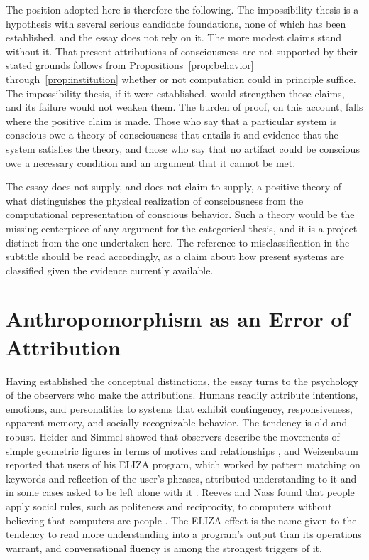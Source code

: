 \documentclass[12pt]{article}
\theoremstyle{definition}
\begin{document}
The position adopted here is therefore the following. The impossibility thesis is a hypothesis with several serious candidate foundations, none of which has been established, and the essay does not rely on it. The more modest claims stand without it. That present attributions of consciousness are not supported by their stated grounds follows from Propositions~\ref{prop:behavior} through~\ref{prop:institution} whether or not computation could in principle suffice. The impossibility thesis, if it were established, would strengthen those claims, and its failure would not weaken them. The burden of proof, on this account, falls where the positive claim is made. Those who say that a particular system is conscious owe a theory of consciousness that entails it and evidence that the system satisfies the theory, and those who say that no artifact could be conscious owe a necessary condition and an argument that it cannot be met.

The essay does not supply, and does not claim to supply, a positive theory of what distinguishes the physical realization of consciousness from the computational representation of conscious behavior. Such a theory would be the missing centerpiece of any argument for the categorical thesis, and it is a project distinct from the one undertaken here. The reference to misclassification in the subtitle should be read accordingly, as a claim about how present systems are classified given the evidence currently available.

\section{Anthropomorphism as an Error of Attribution}
\label{sec:anthropomorphism}

Having established the conceptual distinctions, the essay turns to the psychology of the observers who make the attributions. Humans readily attribute intentions, emotions, and personalities to systems that exhibit contingency, responsiveness, apparent memory, and socially recognizable behavior. The tendency is old and robust. Heider and Simmel showed that observers describe the movements of simple geometric figures in terms of motives and relationships \cite{heider1944}, and Weizenbaum reported that users of his ELIZA program, which worked by pattern matching on keywords and reflection of the user's phrases, attributed understanding to it and in some cases asked to be left alone with it \cite{weizenbaum1966}. Reeves and Nass found that people apply social rules, such as politeness and reciprocity, to computers without believing that computers are people \cite{reevesnass1996,nassmoon2000}. The ELIZA effect is the name given to the tendency to read more understanding into a program's output than its operations warrant, and conversational fluency is among the strongest triggers of it.
\end{document}
